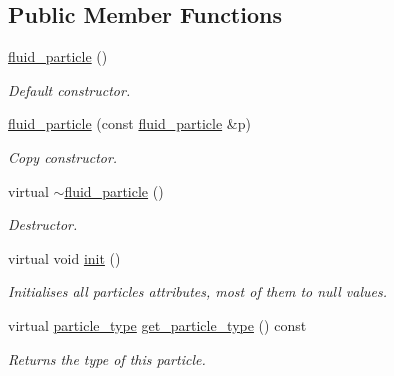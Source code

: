 \subsection*{Public Member Functions}
\begin{DoxyCompactItemize}
\item 
\mbox{\label{classphysim_1_1particles_1_1fluid__particle_a0608e20564e48974f8d05ea1da1f5d8b}} 
\hyperlink{classphysim_1_1particles_1_1fluid__particle_a0608e20564e48974f8d05ea1da1f5d8b}{fluid\+\_\+particle} ()
\begin{DoxyCompactList}\small\item\em Default constructor. \end{DoxyCompactList}\item 
\mbox{\label{classphysim_1_1particles_1_1fluid__particle_a1a60daa5bf72b641f46b7227e9b32a7e}} 
\hyperlink{classphysim_1_1particles_1_1fluid__particle_a1a60daa5bf72b641f46b7227e9b32a7e}{fluid\+\_\+particle} (const \hyperlink{classphysim_1_1particles_1_1fluid__particle}{fluid\+\_\+particle} \&p)
\begin{DoxyCompactList}\small\item\em Copy constructor. \end{DoxyCompactList}\item 
\mbox{\label{classphysim_1_1particles_1_1fluid__particle_afc95cf0e4346e59d54c222dae8c287f6}} 
virtual \hyperlink{classphysim_1_1particles_1_1fluid__particle_afc95cf0e4346e59d54c222dae8c287f6}{$\sim$fluid\+\_\+particle} ()
\begin{DoxyCompactList}\small\item\em Destructor. \end{DoxyCompactList}\item 
virtual void \hyperlink{classphysim_1_1particles_1_1fluid__particle_a0aa522f9400bcb02373edd7bb073249b}{init} ()
\begin{DoxyCompactList}\small\item\em Initialises all particle\textquotesingle{}s attributes, most of them to null values. \end{DoxyCompactList}\item 
\mbox{\label{classphysim_1_1particles_1_1fluid__particle_a14f4c27cc4268f98235b371e060ae996}} 
virtual \hyperlink{namespacephysim_1_1particles_a068e6cda6626fbd381c07a9835425b08}{particle\+\_\+type} \hyperlink{classphysim_1_1particles_1_1fluid__particle_a14f4c27cc4268f98235b371e060ae996}{get\+\_\+particle\+\_\+type} () const
\begin{DoxyCompactList}\small\item\em Returns the type of this particle. \end{DoxyCompactList}\end{DoxyCompactItemize}
